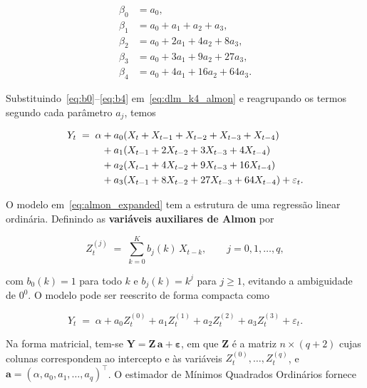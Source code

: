 \begin{align}
    \beta_0 &= a_0, \label{eq:b0} \\
    \beta_1 &= a_0 + a_1 + a_2 + a_3, \label{eq:b1} \\
    \beta_2 &= a_0 + 2a_1 + 4a_2 + 8a_3, \label{eq:b2} \\
    \beta_3 &= a_0 + 3a_1 + 9a_2 + 27a_3, \label{eq:b3} \\
    \beta_4 &= a_0 + 4a_1 + 16a_2 + 64a_3. \label{eq:b4}
\end{align}
 
Substituindo~\eqref{eq:b0}--\eqref{eq:b4} em~\eqref{eq:dlm_k4_almon}
e reagrupando os termos segundo cada parâmetro $a_j$, temos
 
\begin{align}
    Y_t \;=\; \alpha
    &+ a_0\!\left(X_t + X_{t-1} + X_{t-2} + X_{t-3} + X_{t-4}\right)
    \notag \\
    &+ a_1\!\left(X_{t-1} + 2X_{t-2} + 3X_{t-3} + 4X_{t-4}\right)
    \notag \\
    &+ a_2\!\left(X_{t-1} + 4X_{t-2} + 9X_{t-3} + 16X_{t-4}\right)
    \notag \\
    &+ a_3\!\left(X_{t-1} + 8X_{t-2} + 27X_{t-3} + 64X_{t-4}\right)
    + \varepsilon_t.
    \label{eq:almon_expanded}
\end{align}
 
O modelo em~\eqref{eq:almon_expanded} tem a estrutura de uma regressão
linear ordinária. Definindo as \textbf{variáveis auxiliares de Almon} por
 
\begin{equation}
    Z_t^{(j)} \;=\; \sum_{k=0}^{K} b_j(k)\, X_{t-k},
    \qquad j = 0, 1, \ldots, q,
    \label{eq:almon_aux_geral}
\end{equation}

\noindent
com $b_0(k)=1$ para todo $k$ e $b_j(k)=k^j$ para $j\geq1$, evitando a ambiguidade de $0^0$. O modelo pode ser reescrito de forma compacta como
 
\begin{equation}
    Y_t \;=\; \alpha
             + a_0 Z_t^{(0)}
             + a_1 Z_t^{(1)}
             + a_2 Z_t^{(2)}
             + a_3 Z_t^{(3)}
             + \varepsilon_t.
    \label{eq:almon_z}
\end{equation}
 
Na forma matricial, tem-se $\mathbf{Y} = \mathbf{Z}\,\boldsymbol{a}
+ \boldsymbol{\varepsilon}$, em que $\mathbf{Z}$ é a matriz $n\times(q+2)$
cujas colunas correspondem ao intercepto e às variáveis
$Z_t^{(0)}, \ldots, Z_t^{(q)}$, e
$\boldsymbol{a} = (\alpha, a_0, a_1, \ldots, a_q)^{\!\top}$.
O estimador de Mínimos Quadrados Ordinários fornece
 
